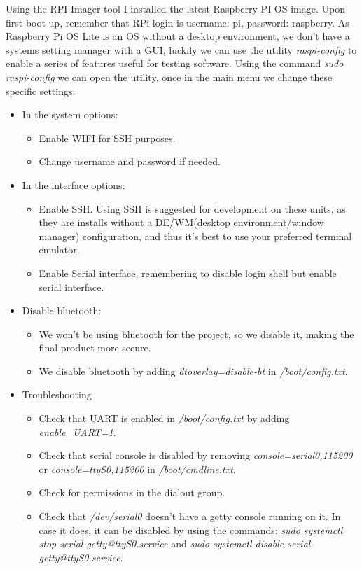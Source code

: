 \documentclass[a4paper, 12pt]{book}
\begin{document}
Using the RPI-Imager tool I installed the latest Raspberry PI OS image. Upon first boot up, remember that RPi login is username: pi, password: raspberry.
As Raspberry Pi OS Lite is an OS without a desktop environment, we don't have a systems setting manager with a GUI, luckily we can use the utility \textit{raspi-config} to enable a series of features useful for testing software.
Using the command \textit{sudo raspi-config} we can open the utility, once in the main menu we change these specific settings:
\begin{itemize}
    \item In the system options:
    \begin{itemize}
        \item Enable WIFI for SSH purposes.
        \item Change username and password if needed.
    \end{itemize}
    \item In the interface options:
    \begin{itemize}
        \item Enable SSH. Using SSH is suggested for development on these units, as they are installs without a DE/WM(desktop environment/window manager) configuration, and thus it's best to use your preferred terminal emulator.
        \item Enable Serial interface, remembering to disable login shell but enable serial interface.
    \end{itemize}
    \item Disable bluetooth:
    \begin{itemize}
        \item We won't be using bluetooth for the project, so we disable it, making the final product more secure.
        \item We disable bluetooth by adding \textit{dtoverlay=disable-bt} in \textit{/boot/config.txt}.
    \end{itemize}
    \item Troubleshooting
    \begin{itemize}
        \item Check that UART is enabled in \textit{/boot/config.txt} by adding \textit{enable\_UART=1}.
        \item Check that serial console is disabled by removing \textit{console=serial0,115200} or \textit{console=ttyS0,115200} in \textit{/boot/cmdline.txt}.
        \item Check for permissions in the dialout group.
        \item Check that \textit{/dev/serial0} doesn't have a getty console running on it. In case it does, it can be disabled by using the commands: \textit{sudo systemctl stop serial-getty@ttyS0.service} and \textit{sudo systemctl disable serial-getty@ttyS0.service}.

\end{itemize}
\end{itemize}
\end{document}
